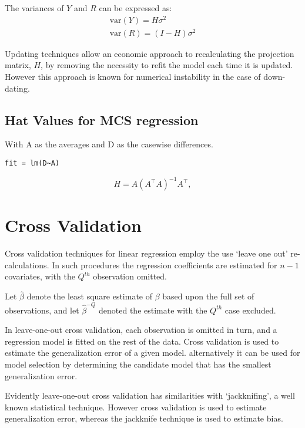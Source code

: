 \documentclass[12pt, a4paper]{article}
\begin{document}
The variances of $Y$ and $R$ can be expressed as:
\begin{eqnarray}
\mbox{var}(Y) = H\sigma^{2} \nonumber\\
\mbox{var}(R) = (I-H)\sigma^{2}
\end{eqnarray}

Updating techniques allow an economic approach to recalculating the projection matrix, $H$, by removing the necessity to refit the model each time it is updated. However this approach is known for
numerical instability in the case of down-dating.



\subsection{Hat Values for MCS regression}

With A as the averages and D as the casewise differences.
\begin{verbatim}
fit = lm(D~A)
\end{verbatim}

\begin{displaymath}
H = A \left(A^\top  A\right)^{-1} A^\top ,
\end{displaymath}

\newpage
\section{Cross Validation} %

Cross validation techniques for linear regression employ the use `leave one out' re-calculations. In such procedures the regression coefficients are estimated for $n-1$ covariates, with the $Q^{th}$ observation omitted.

Let $\hat{\beta}$ denote the least square estimate of $\beta$ based upon the full set of observations, and let
$\hat{\beta}^{-Q}$ denoted the estimate with the $Q^{th}$ case
excluded.


In leave-one-out cross validation, each observation is omitted in turn, and a regression model is fitted on the rest of the data. Cross validation is used to estimate the generalization error of a given model. alternatively it can be used for model selection by determining the candidate model that has the smallest generalization error.


Evidently leave-one-out cross validation has similarities with `jackknifing', a well known statistical technique. However cross validation is used to estimate generalization error, whereas the jackknife technique is used to estimate bias.
\end{document}
